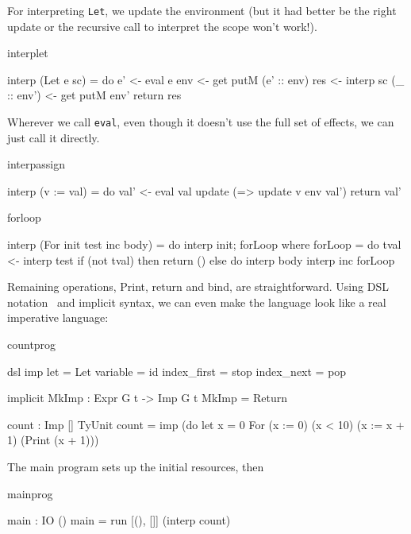 For interpreting \texttt{Let}, we update the environment (but it had better
be the right update or the recursive call to interpret the scope won't work!).

\begin{SaveVerbatim}{interplet}

interp (Let e sc) 
     = do e' <- eval e
          env <- get
          putM (e' :: env)
          res <- interp sc
          (_ :: env') <- get
          putM env'
          return res
\end{SaveVerbatim}

Wherever we call \texttt{eval}, even though it doesn't use the full set of
effects, we can just call it directly.

\begin{SaveVerbatim}{interpassign}

interp (v := val) 
     = do val' <- eval val
          update (\env => update v env val')
          return val'

\end{SaveVerbatim}

\begin{SaveVerbatim}{forloop}

interp (For init test inc body)
     = do interp init; forLoop 
  where forLoop = do tval <- interp test
                     if (not tval) 
                        then return ()
                        else do interp body
                                interp inc
                                forLoop 

\end{SaveVerbatim}


Remaining operations, Print, return and bind, are straightforward.
Using DSL notation~\cite{Brady2012} and implicit syntax, we can even make
the language look like a real imperative language:

\begin{SaveVerbatim}{countprog}

dsl imp
    let = Let
    variable = id
    index_first = stop
    index_next = pop

implicit MkImp : Expr G t -> Imp G t
MkImp = Return

count : Imp [] TyUnit
count = imp (do let x = 0
                For (x := 0) (x < 10) (x := x + 1)
                    (Print (x + 1)))

\end{SaveVerbatim}

The main program sets up the initial resources, then 

\begin{SaveVerbatim}{mainprog}

main : IO ()
main = run [(), []] (interp count)

\end{SaveVerbatim}

